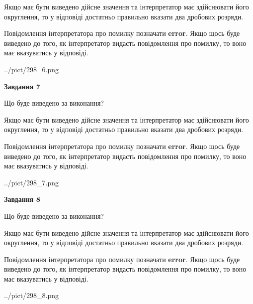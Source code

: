 \documentclass[12pt, ukrainian]{article}
\begin{document}
{\begin {Large}
Якщо має бути виведено дійсне значення та інтерпретатор має здійснювати його округлення, 
то у відповіді достатньо правильно вказати два дробових розряди.

Повідомлення інтерпретатора про помилку позначати \textbf{error}.
Якщо щось буде виведено до того, як інтерпретатор видасть повідомлення про помилку, 
то воно має вказуватись у відповіді. \par

\begin{center}
	{../pict/298_6.png}
\end{center}
\newpage

{\begin {center}\textbf{Завдання 7}\end {center}}\par
Що буде виведено за виконання? \par

Якщо має бути виведено дійсне значення та інтерпретатор має здійснювати його округлення, 
то у відповіді достатньо правильно вказати два дробових розряди.

Повідомлення інтерпретатора про помилку позначати \textbf{error}.
Якщо щось буде виведено до того, як інтерпретатор видасть повідомлення про помилку, 
то воно має вказуватись у відповіді. \par

\begin{center}
	{../pict/298_7.png}
\end{center}
\newpage

{\begin {center}\textbf{Завдання 8}\end {center}}\par
Що буде виведено за виконання? \par

Якщо має бути виведено дійсне значення та інтерпретатор має здійснювати його округлення, 
то у відповіді достатньо правильно вказати два дробових розряди.

Повідомлення інтерпретатора про помилку позначати \textbf{error}.
Якщо щось буде виведено до того, як інтерпретатор видасть повідомлення про помилку, 
то воно має вказуватись у відповіді. \par

\begin{center}
	{../pict/298_8.png}
\end{center}
\newpage


\end{Large}}
\end{document}
